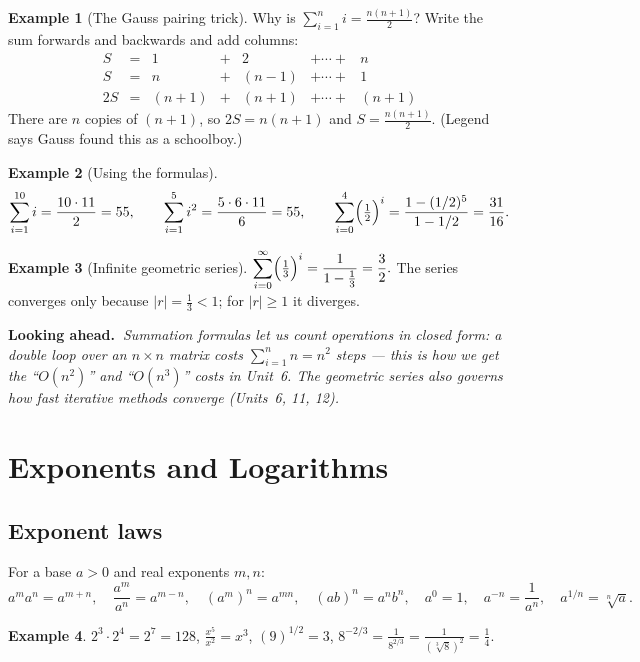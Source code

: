 \documentclass[11pt]{article}
\theoremstyle{definition}
\newtheorem{example}{Example}[section]
\newcommand{\lookahead}[1]{%
  \par\smallskip\noindent
  {\sffamily\bfseries\color{BrickRed}Looking ahead.~}\textit{#1}\par\smallskip}
\newcommand{\ds}{\displaystyle}
\begin{document}
\begin{example}[The Gauss pairing trick]
Why is $\sum_{i=1}^n i=\frac{n(n+1)}{2}$? Write the sum forwards and backwards and
add columns:
\[
\begin{array}{ccccccc}
S &=& 1 &+& 2 &+\cdots+& n\\
S &=& n &+& (n{-}1) &+\cdots+& 1\\ \hline
2S &=& (n{+}1) &+& (n{+}1) &+\cdots+& (n{+}1)
\end{array}
\]
There are $n$ copies of $(n+1)$, so $2S=n(n+1)$ and $S=\frac{n(n+1)}{2}$. (Legend
says Gauss found this as a schoolboy.)
\end{example}

\begin{example}[Using the formulas]
\[
\sum_{i=1}^{10} i = \frac{10\cdot 11}{2}=55,\qquad
\sum_{i=1}^{5} i^2=\frac{5\cdot 6\cdot 11}{6}=55,\qquad
\sum_{i=0}^{4} \Bigl(\tfrac12\Bigr)^{i}=\frac{1-(1/2)^5}{1-1/2}=\frac{31}{16}.
\]
\end{example}

\begin{example}[Infinite geometric series]
$\ds\sum_{i=0}^{\infty}\Bigl(\tfrac13\Bigr)^i=\frac{1}{1-\frac13}=\frac{3}{2}.$
The series converges only because $|r|=\frac13<1$; for $|r|\ge 1$ it diverges.
\end{example}

\lookahead{Summation formulas let us count operations in closed form: a double
loop over an $n\times n$ matrix costs $\sum_{i=1}^{n} n = n^2$ steps --- this is
how we get the ``$O(n^2)$'' and ``$O(n^3)$'' costs in Unit~6. The geometric series
also governs how fast iterative methods converge (Units~6, 11, 12).}

\section{Exponents and Logarithms}

\subsection{Exponent laws}
For a base $a>0$ and real exponents $m,n$:
\[
a^m a^n=a^{m+n},\quad \frac{a^m}{a^n}=a^{m-n},\quad (a^m)^n=a^{mn},\quad
(ab)^n=a^n b^n,\quad a^0=1,\quad a^{-n}=\frac{1}{a^n},\quad a^{1/n}=\sqrt[n]{a}.
\]

\begin{example}
$\ds 2^3\cdot 2^4 = 2^7 = 128$, \quad $\ds\frac{x^5}{x^2}=x^3$, \quad
$\ds (9)^{1/2}=3$, \quad $\ds 8^{-2/3}=\frac{1}{8^{2/3}}=\frac{1}{(\sqrt[3]{8})^2}=\frac14.$
\end{example}
\end{document}
